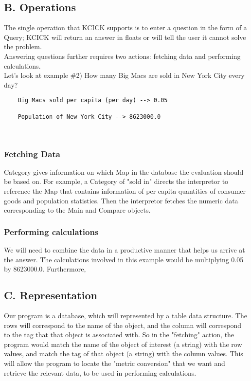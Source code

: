 \documentclass{article}
\begin{document}
\subsection{B. Operations} 
The single operation that KCICK supports is to enter a question in the form of a Query; KCICK will return an answer in floats or will tell the user it cannot solve the problem.\\

Answering questions further requires two actions: fetching data and performing calculations.\\

Let's look at example \#2) How many Big Macs are sold in New York City every day?\\

\begin{verbatim} 
    Big Macs sold per capita (per day) --> 0.05
    
    Population of New York City --> 8623000.0
    
    
\end{verbatim}
\subsubsection{Fetching Data}

Category gives information on which Map in the database the evaluation should be based on. For example, a Category of "sold in" directs the interpretor to reference the Map that contains information of  per capita quantities of consumer goods and population statistics. Then the interpretor fetches the numeric data corresponding to the Main and Compare objects.\\

\subsubsection{Performing calculations}

We will need to combine the data in a productive manner that helps us arrive at the answer. The calculations involved in this example would be multiplying 0.05 by 8623000.0. Furthermore, 

\subsection{C. Representation}
Our program is a database, which will represented by a table data structure. The rows will correspond to the name of the object, and the column will correspond to the tag that that object is associated with. So in the "fetching" action, the program would match the name of the object of interest (a string) with the row values, and match the tag of that object (a string) with the column values. This will allow the program to locate the "metric conversion" that we want and retrieve the relevant data, to be used in performing calculations.
\end{document}

